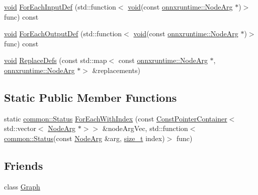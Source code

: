 \begin{DoxyCompactItemize}
\item 
\mbox{\hyperlink{mlasi_8h_a88f941d423cb2a819b70a1358982b1a6}{void}} \mbox{\hyperlink{classonnxruntime_1_1Node_a18c5aa182e07cf09b8ab8d9deb014a8c}{For\+Each\+Input\+Def}} (std\+::function$<$ \mbox{\hyperlink{mlasi_8h_a88f941d423cb2a819b70a1358982b1a6}{void}}(const \mbox{\hyperlink{classonnxruntime_1_1NodeArg}{onnxruntime\+::\+Node\+Arg}} $\ast$)$>$ func) const
\item 
\mbox{\hyperlink{mlasi_8h_a88f941d423cb2a819b70a1358982b1a6}{void}} \mbox{\hyperlink{classonnxruntime_1_1Node_a28fd0150c29bb6c31b863ea8fd8f456b}{For\+Each\+Output\+Def}} (std\+::function$<$ \mbox{\hyperlink{mlasi_8h_a88f941d423cb2a819b70a1358982b1a6}{void}}(const \mbox{\hyperlink{classonnxruntime_1_1NodeArg}{onnxruntime\+::\+Node\+Arg}} $\ast$)$>$ func) const
\item 
\mbox{\hyperlink{mlasi_8h_a88f941d423cb2a819b70a1358982b1a6}{void}} \mbox{\hyperlink{classonnxruntime_1_1Node_aa31e823c0e4219de6709f17742ac07de}{Replace\+Defs}} (const std\+::map$<$ const \mbox{\hyperlink{classonnxruntime_1_1NodeArg}{onnxruntime\+::\+Node\+Arg}} $\ast$, \mbox{\hyperlink{classonnxruntime_1_1NodeArg}{onnxruntime\+::\+Node\+Arg}} $\ast$$>$ \&replacements)
\end{DoxyCompactItemize}
\subsection*{Static Public Member Functions}
\begin{DoxyCompactItemize}
\item 
static \mbox{\hyperlink{classonnxruntime_1_1common_1_1Status}{common\+::\+Status}} \mbox{\hyperlink{classonnxruntime_1_1Node_a98a99b6bf75b766f90f0b0ec26597aaa}{For\+Each\+With\+Index}} (const \mbox{\hyperlink{classonnxruntime_1_1ConstPointerContainer}{Const\+Pointer\+Container}}$<$ std\+::vector$<$ \mbox{\hyperlink{classonnxruntime_1_1NodeArg}{Node\+Arg}} $\ast$$>$$>$ \&node\+Arg\+Vec, std\+::function$<$ \mbox{\hyperlink{classonnxruntime_1_1common_1_1Status}{common\+::\+Status}}(const \mbox{\hyperlink{classonnxruntime_1_1NodeArg}{Node\+Arg}} \&arg, \mbox{\hyperlink{mlasi_8h_a503efbc1c6e50825320ad909366b78ab}{size\+\_\+t}} index)$>$ func)
\end{DoxyCompactItemize}
\subsection*{Friends}
\begin{DoxyCompactItemize}
\item 
class \mbox{\hyperlink{classonnxruntime_1_1Node_afab89afd724f1b07b1aaad6bdc61c47a}{Graph}}
\end{DoxyCompactItemize}



